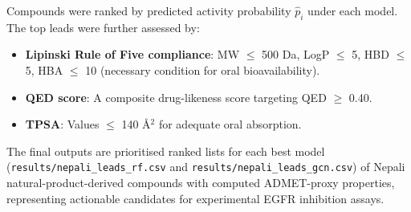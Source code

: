 Compounds were ranked by predicted activity probability $\hat{p}_i$ under each model.
The top leads were further assessed by:
\begin{itemize}
    \item \textbf{Lipinski Rule of Five compliance}: MW $\leq$ 500 Da, LogP $\leq$ 5,
          HBD $\leq$ 5, HBA $\leq$ 10 (necessary condition for oral bioavailability).
    \item \textbf{QED score}: A composite drug-likeness score targeting QED $\geq$ 0.40.
    \item \textbf{TPSA}: Values $\leq$ 140 \AA$^2$ for adequate oral absorption.
\end{itemize}

The final outputs are prioritised ranked lists for each best model
(\texttt{results/nepali\_leads\_rf.csv} and \texttt{results/nepali\_leads\_gcn.csv})
of Nepali natural-product-derived compounds with computed ADMET-proxy properties,
representing actionable candidates for experimental EGFR inhibition assays.

